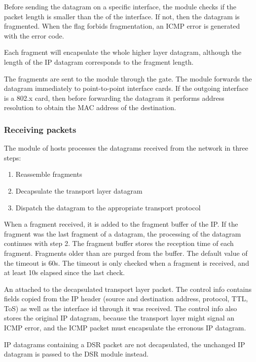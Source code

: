 Before sending the datagram on a specific interface, the  module
checks if the packet length is smaller than the  of the interface.
If not, then the datagram is fragmented. When the  flag
forbids fragmentation, an  ICMP error is generated
with the  error code.
\begin{note}
Each fragment will encapsulate the whole higher layer datagram, although the
length of the IP datagram corresponds to the fragment length.
\end{note}

The fragments are sent to the  module through the  gate.
The  module forwards the datagram immediately to point-to-point interface
cards. If the outgoing interface is a 802.x card, then before forwarding the datagram
it performs address resolution to obtain the MAC address of the destination.

\subsubsection*{Receiving packets}

The  module of hosts processes the datagrams received from the network
in three steps:
\begin{enumerate}
  \item Reassemble fragments
  \item Decapsulate the transport layer datagram
  \item Dispatch the datagram to the appropriate transport protocol
\end{enumerate}

When a fragment received, it is added to the fragment buffer of the IP.
If the fragment was the last fragment of a datagram, the processing of
the datagram continues with step 2. The fragment buffer stores the reception
time of each fragment. Fragments older than  are
purged from the buffer. The default value of the timeout is 60s. The
timeout is only checked when a fragment is received, and at least 10s
elapsed since the last check.

An  attached to the decapsulated transport layer packet.
The control info contains fields copied from the IP header (source and destination
address, protocol, TTL, ToS) as well as the interface id through it was received.
The control info also stores the original IP datagram, because the transport
layer might signal an ICMP error, and the ICMP packet must encapsulate the
erronous IP datagram.
\begin{note}
IP datagrams containing a DSR packet are not decapsulated, the unchanged IP
datagram is passed to the DSR module instead.
\end{note}

